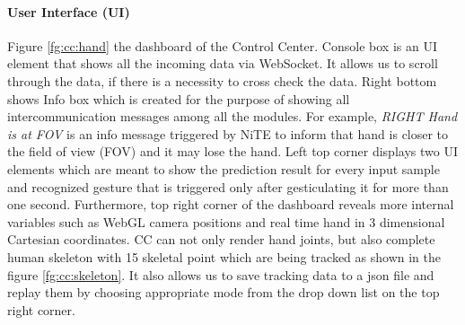 \paragraph*{User Interface (UI) } Figure \ref{fg:cc:hand} the dashboard of the Control Center. Console box is an UI element that shows all the incoming data via WebSocket. It allows us to scroll through the data, if there is a necessity to cross check the data. Right bottom shows Info box which is created for the purpose of showing all intercommunication messages among all the modules. For example, \textit{RIGHT Hand is at FOV} is an info message triggered by NiTE to inform that hand is closer to the field of view (FOV) and it may lose the hand. Left top corner displays two UI elements which are meant to show the prediction result for every input sample and recognized gesture that is triggered only after gesticulating it for more than one second. Furthermore, top right corner of the dashboard reveals more internal variables such as WebGL camera positions and real time hand in 3 dimensional Cartesian coordinates. CC can not only render hand joints, but also complete human skeleton with 15 skeletal point which are being tracked as shown in the figure \ref{fg:cc:skeleton}. It also allows us to save tracking data to a json file and replay them by choosing appropriate mode from the drop down list on the top right corner.
